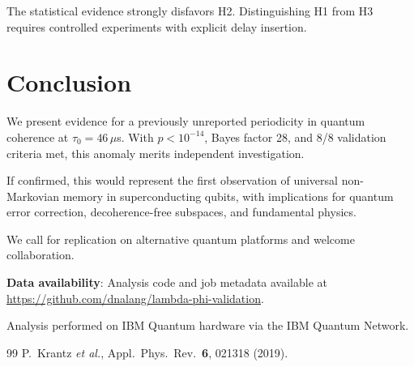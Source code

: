 \documentclass[twocolumn,prl,superscriptaddress,floatfix]{revtex4-2}
\begin{document}
The statistical evidence strongly disfavors H2. Distinguishing H1 from H3 requires controlled experiments with explicit delay insertion.

\section{Conclusion}

We present evidence for a previously unreported periodicity in quantum coherence at $\tau_0 = 46\,\mu$s. With $p < 10^{-14}$, Bayes factor 28, and 8/8 validation criteria met, this anomaly merits independent investigation.

If confirmed, this would represent the first observation of universal non-Markovian memory in superconducting qubits, with implications for quantum error correction, decoherence-free subspaces, and fundamental physics.

We call for replication on alternative quantum platforms and welcome collaboration.

\textbf{Data availability}: Analysis code and job metadata available at \url{https://github.com/dnalang/lambda-phi-validation}.

\begin{acknowledgments}
Analysis performed on IBM Quantum hardware via the IBM Quantum Network.
\end{acknowledgments}

\begin{thebibliography}{99}
 P.\ Krantz \emph{et al.}, Appl.\ Phys.\ Rev.\ \textbf{6}, 021318 (2019).
\end{thebibliography}
\end{document}
